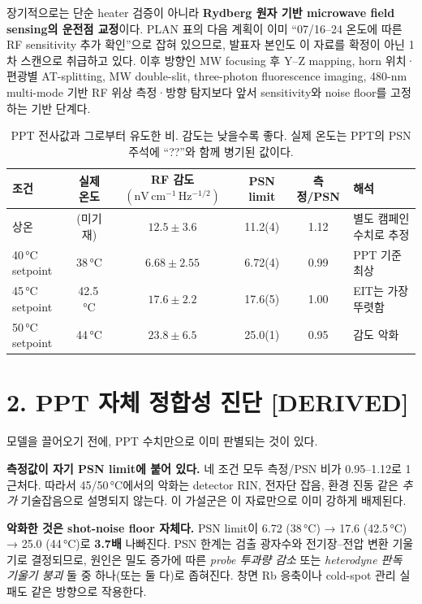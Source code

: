 \documentclass[10pt,a4paper]{article}
\newcommand{\Status}[1]{\textsf{\footnotesize[#1]}}
\newcommand{\sensunit}{\mathrm{nV\,cm^{-1}\,Hz^{-1/2}}}
\begin{document}
장기적으로는 단순 heater 검증이 아니라 \textbf{Rydberg 원자 기반 microwave field sensing의
운전점 교정}이다. PLAN 표의 다음 계획이 이미 ``07/16--24 온도에 따른 RF sensitivity 추가 확인''으로
잡혀 있으므로, 발표자 본인도 이 자료를 확정이 아닌 1차 스캔으로 취급하고 있다. 이후 방향인
MW focusing 후 Y--Z mapping, horn 위치·편광별 AT-splitting, MW double-slit,
three-photon fluorescence imaging, 480-nm multi-mode 기반 RF 위상 측정·방향 탐지보다 앞서
sensitivity와 noise floor를 고정하는 기반 단계다.

\begin{table}[h]
\centering
\small
\caption{PPT 전사값과 그로부터 유도한 비. 감도는 낮을수록 좋다. 실제 온도는 PPT의 PSN
주석에 ``??''와 함께 병기된 값이다.}
\begin{tabular}{lccccl}
\toprule
조건 & 실제 온도 & RF 감도 \((\sensunit)\) & PSN limit & 측정/PSN & 해석\\
\midrule
상온 & (미기재) & \(12.5\pm3.6\) & 11.2(4) & 1.12 & 별도 캠페인 수치로 추정\\
40\,°C setpoint & 38\,°C & \(\mathbf{6.68\pm2.55}\) & 6.72(4) & 0.99 & PPT 기준 최상\\
45\,°C setpoint & 42.5\,°C & \(17.6\pm2.2\) & 17.6(5) & 1.00 & EIT는 가장 뚜렷함\\
50\,°C setpoint & 44\,°C & \(23.8\pm6.5\) & 25.0(1) & 0.95 & 감도 악화\\
\bottomrule
\end{tabular}
\end{table}

\section*{2. PPT 자체 정합성 진단 \Status{DERIVED}}

모델을 끌어오기 전에, PPT 수치만으로 이미 판별되는 것이 있다.

\textbf{측정값이 자기 PSN limit에 붙어 있다.} 네 조건 모두 측정/PSN 비가 0.95--1.12로 1 근처다.
따라서 45/50\,°C에서의 악화는 detector RIN, 전자단 잡음, 환경 진동 같은 \emph{추가} 기술잡음으로
설명되지 않는다. 이 가설군은 이 자료만으로 이미 강하게 배제된다.

\textbf{악화한 것은 shot-noise floor 자체다.} PSN limit이 6.72 (38\,°C) → 17.6 (42.5\,°C)
→ 25.0 (44\,°C)로 \textbf{3.7배} 나빠진다. PSN 한계는 검출 광자수와 전기장--전압 변환 기울기로
결정되므로, 원인은 밀도 증가에 따른 \emph{probe 투과량 감소} 또는 \emph{heterodyne 판독 기울기 붕괴}
둘 중 하나(또는 둘 다)로 좁혀진다. 창면 Rb 응축이나 cold-spot 관리 실패도 같은 방향으로 작용한다.
\end{document}
